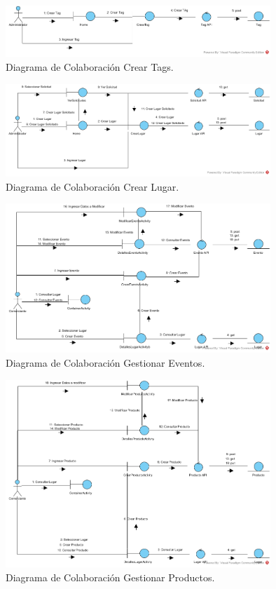 \documentclass[12pt,letterpaper,openany]{book}
\begin{document}
\begin{figure}[H]
\begin{center}
\includegraphics[width=10cm]{./imagenes/DC/DC_crear_tag}
\caption{Diagrama de Colaboración Crear Tags.}
\end{center}
\end{figure}

\begin{figure}[H]
\begin{center}
\includegraphics[width=10cm]{./imagenes/DC/DC_crear_lugar}
\caption{Diagrama de Colaboración Crear Lugar.}
\end{center}
\end{figure}

\begin{figure}[H]
\begin{center}
\includegraphics[width=10cm]{./imagenes/DC/DC_gestionar_evento}
\caption{Diagrama de Colaboración Gestionar Eventos.}
\end{center}
\end{figure}

\begin{figure}[H]
\begin{center}
\includegraphics[width=10cm]{./imagenes/DC/DC_gestionar_producto}
\caption{Diagrama de Colaboración Gestionar Productos.}
\end{center}
\end{figure}
\end{document}
